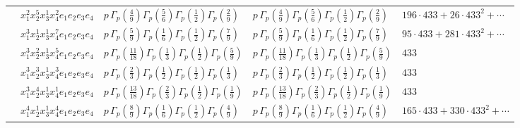 \documentclass[11pt]{article}
\begin{document}
\begin{table}[ht]
{\begin{tabular}{@{}lllll@{}}
 & $x_{1}^{2} x_{2}^{5} x_{3}^{1} x_{4}^{2}  e_{1} e_{2} e_{3} e_{4}$ & $p \, \Gamma_p \left( \frac{4}{9} \right) \Gamma_p \left( \frac{5}{6} \right) \Gamma_p \left( \frac{1}{2} \right) \Gamma_p \left( \frac{2}{9} \right)$ & $p \, \Gamma_p \left( \frac{4}{9} \right) \Gamma_p \left( \frac{5}{6} \right) \Gamma_p \left( \frac{1}{2} \right) \Gamma_p \left( \frac{2}{9} \right)$ & $196{\cdot}433{+}26{\cdot}433^{2}{+}\cdots$ \\
 & $x_{1}^{3} x_{2}^{1} x_{3}^{1} x_{4}^{7}  e_{1} e_{2} e_{3} e_{4}$ & $p \, \Gamma_p \left( \frac{5}{9} \right) \Gamma_p \left( \frac{1}{6} \right) \Gamma_p \left( \frac{1}{2} \right) \Gamma_p \left( \frac{7}{9} \right)$ & $p \, \Gamma_p \left( \frac{5}{9} \right) \Gamma_p \left( \frac{1}{6} \right) \Gamma_p \left( \frac{1}{2} \right) \Gamma_p \left( \frac{7}{9} \right)$ & $95{\cdot}433{+}281{\cdot}433^{2}{+}\cdots$ \\
 & $x_{1}^{3} x_{2}^{2} x_{3}^{1} x_{4}^{5}  e_{1} e_{2} e_{3} e_{4}$ & $p \, \Gamma_p \left( \frac{11}{18} \right) \Gamma_p \left( \frac{1}{3} \right) \Gamma_p \left( \frac{1}{2} \right) \Gamma_p \left( \frac{5}{9} \right)$ & $p \, \Gamma_p \left( \frac{11}{18} \right) \Gamma_p \left( \frac{1}{3} \right) \Gamma_p \left( \frac{1}{2} \right) \Gamma_p \left( \frac{5}{9} \right)$ & $433$ \\
 & $x_{1}^{3} x_{2}^{3} x_{3}^{1} x_{4}^{3}  e_{1} e_{2} e_{3} e_{4}$ & $p \, \Gamma_p \left( \frac{2}{3} \right) \Gamma_p \left( \frac{1}{2} \right) \Gamma_p \left( \frac{1}{2} \right) \Gamma_p \left( \frac{1}{3} \right)$ & $p \, \Gamma_p \left( \frac{2}{3} \right) \Gamma_p \left( \frac{1}{2} \right) \Gamma_p \left( \frac{1}{2} \right) \Gamma_p \left( \frac{1}{3} \right)$ & $433$ \\
 & $x_{1}^{3} x_{2}^{4} x_{3}^{1} x_{4}^{1}  e_{1} e_{2} e_{3} e_{4}$ & $p \, \Gamma_p \left( \frac{13}{18} \right) \Gamma_p \left( \frac{2}{3} \right) \Gamma_p \left( \frac{1}{2} \right) \Gamma_p \left( \frac{1}{9} \right)$ & $p \, \Gamma_p \left( \frac{13}{18} \right) \Gamma_p \left( \frac{2}{3} \right) \Gamma_p \left( \frac{1}{2} \right) \Gamma_p \left( \frac{1}{9} \right)$ & $433$ \\
 & $x_{1}^{4} x_{2}^{1} x_{3}^{1} x_{4}^{4}  e_{1} e_{2} e_{3} e_{4}$ & $p \, \Gamma_p \left( \frac{8}{9} \right) \Gamma_p \left( \frac{1}{6} \right) \Gamma_p \left( \frac{1}{2} \right) \Gamma_p \left( \frac{4}{9} \right)$ & $p \, \Gamma_p \left( \frac{8}{9} \right) \Gamma_p \left( \frac{1}{6} \right) \Gamma_p \left( \frac{1}{2} \right) \Gamma_p \left( \frac{4}{9} \right)$ & $165{\cdot}433{+}330{\cdot}433^{2}{+}\cdots$ \\

\end{tabular}}
\end{table}
\end{document}
